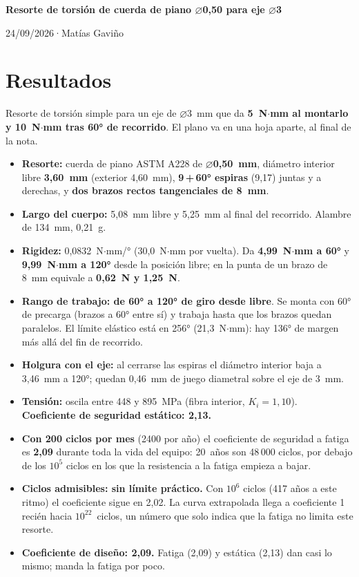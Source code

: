 \documentclass[11pt,a4paper]{article}
\newcommand{\titulo}{Resorte de torsión de cuerda de piano \texorpdfstring{$\varnothing$}{Ø}0,50 para eje \texorpdfstring{$\varnothing$}{Ø}3}
\newcommand{\autor}{Matías Gaviño}
\newcommand{\fecha}{24/09/2026}                    %
\newcommand{\cabecera}{%
  \thispagestyle{fancy}%
  {\fontsize{20}{24}\selectfont\bfseries\titulo\par}%
  \vspace{5pt}%
  {\small\color{gris-medio}\fecha\quad·\quad\autor\par}%
  \vspace{6pt}}
\begin{document}
\cabecera

\section{Resultados}
Resorte de torsión simple para un eje de $\varnothing$3~mm que da \textbf{5~N$\cdot$mm al montarlo y
10~N$\cdot$mm tras 60° de recorrido}. El plano va en una hoja aparte, al final de la nota.

\begin{itemize}
  \item \textbf{Resorte:} cuerda de piano ASTM A228 de \textbf{$\varnothing$0,50~mm}, diámetro interior
        libre \textbf{3,60~mm} (exterior 4,60~mm), \textbf{9\,+\,60° espiras} (9,17) juntas y a derechas,
        y \textbf{dos brazos rectos tangenciales de 8~mm}.
  \item \textbf{Largo del cuerpo:} 5,08~mm libre y 5,25~mm al final del recorrido. Alambre de 134~mm, 0,21~g.
  \item \textbf{Rigidez:} 0,0832~N$\cdot$mm/° (30,0~N$\cdot$mm por vuelta). Da \textbf{4,99~N$\cdot$mm
        a 60°} y \textbf{9,99~N$\cdot$mm a 120°} desde la posición libre; en la punta de un brazo de
        8~mm equivale a \textbf{0,62~N y 1,25~N}.
  \item \textbf{Rango de trabajo: de 60° a 120° de giro desde libre}. Se monta con 60° de precarga
        (brazos a 60° entre sí) y trabaja hasta que los brazos quedan paralelos. El límite elástico
        está en 256° (21,3~N$\cdot$mm): hay 136° de margen más allá del fin de recorrido.
  \item \textbf{Holgura con el eje:} al cerrarse las espiras el diámetro interior baja a 3,46~mm a 120°;
        quedan 0,46~mm de juego diametral sobre el eje de 3~mm.
  \item \textbf{Tensión:} oscila entre 448 y 895~MPa (fibra interior, $K_i = 1{,}10$).
        \textbf{Coeficiente de seguridad estático: 2,13.}
  \item \textbf{Con 200 ciclos por mes} (2400 por año) el coeficiente de seguridad a fatiga es
        \textbf{2,09} durante toda la vida del equipo: 20~años son 48\,000 ciclos, por debajo de los
        $10^5$ ciclos en los que la resistencia a la fatiga empieza a bajar.
  \item \textbf{Ciclos admisibles: sin límite práctico.} Con $10^6$ ciclos (417 años a este ritmo) el
        coeficiente sigue en 2,02. La curva extrapolada llega a coeficiente 1 recién hacia
        $10^{22}$~ciclos, un número que solo indica que la fatiga no limita este resorte.
  \item \textbf{Coeficiente de diseño: 2,09.} Fatiga (2,09) y estática (2,13) dan casi lo mismo; manda la fatiga por poco.
\end{itemize}
\end{document}
